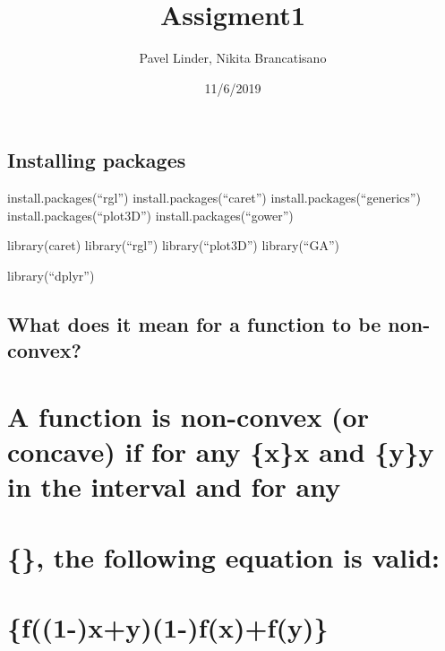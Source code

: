\documentclass[]{article}
\title{Assigment1}
\author{Pavel Linder, Nikita Brancatisano}
\date{11/6/2019}
\begin{document}
\maketitle

\hypertarget{installing-packages}{%
\subsection{Installing packages}\label{installing-packages}}

install.packages(``rgl'') install.packages(``caret'')
install.packages(``generics'') install.packages(``plot3D'')
install.packages(``gower'')

library(caret) library(``rgl'') library(``plot3D'') library(``GA'')

library(``dplyr'')

\hypertarget{what-does-it-mean-for-a-function-to-be-non-convex}{%
\subsection{What does it mean for a function to be
non-convex?}\label{what-does-it-mean-for-a-function-to-be-non-convex}}

\hypertarget{a-function-is-non-convex-or-concave-if-for-any-xx-and-yy-in-the-interval-and-for-any}{%
\section{\texorpdfstring{A function is non-convex (or concave) if for
any \{\displaystyle x\}x and \{\displaystyle y\}y in the interval and
for
any}{A function is non-convex (or concave) if for any \{x\}x and \{y\}y in the interval and for any}}\label{a-function-is-non-convex-or-concave-if-for-any-xx-and-yy-in-the-interval-and-for-any}}

\hypertarget{the-following-equation-is-valid}{%
\section{\texorpdfstring{\{\displaystyle \alpha \in [0,1]\}\alpha \in [0,1],
the following equation is
valid:}{\{\}, the following equation is valid:}}\label{the-following-equation-is-valid}}

\hypertarget{f1-xy1-fxfy}{%
\section{\texorpdfstring{\{\displaystyle f((1-\alpha )x+\alpha y)\geq (1-\alpha )f(x)+\alpha f(y)\}}{\{f((1-)x+y)(1-)f(x)+f(y)\}}}\label{f1-xy1-fxfy}}
\end{document}
